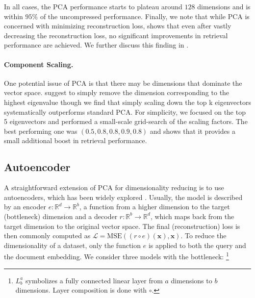 In all cases, the PCA performance starts to plateau around $128$ dimensions and is within $95\%$ of the uncompressed performance. 
Finally, we note that while PCA is concerned with minimizing reconstruction loss,   shows that even after vastly decreasing the reconstruction loss, no significant improvements in retrieval performance are achieved.
We further discuss this finding in .

\paragraph{Component Scaling.}
One potential issue of PCA is that there may be dimensions that dominate the vector space.
\citet{mu2017all} suggest to simply remove the dimension corresponding to the highest eigenvalue though we find that simply scaling down the top k eigenvectors systematically outperforms standard PCA.
For simplicity, we focused on the top 5 eigenvectors and performed a small-scale grid-search of the scaling factors.
The best performing one was $(0.5, 0.8, 0.8, 0.9, 0.8)$ and  shows that it provides a small additional boost in retrieval performance.

\subsection{Autoencoder} \label{subsec:auto}

A straightforward extension of PCA for dimensionality reducing is to use autoencoders, which has been widely explored \citep{hu2014improving,wang2016auto}.
Usually, the model is described by an encoder $e : \mathbb{R}^d \rightarrow \mathbb{R}^b$, a function from a higher dimension to the target (bottleneck) dimension and a decoder $r : \mathbb{R}^b \rightarrow \mathbb{R}^d$, which maps back from the target dimension to the original vector space.
The final (reconstruction) loss is then commonly computed as $\mathcal{L} = \text{MSE}((r \circ e)(\bm{x}), \bm{x})$.
To reduce the dimensionality of a dataset, only the function $e$ is applied to both the query and the document embedding.
We consider three models with the bottleneck:
\footnote{$L_b^a$ symbolizes a fully connected linear layer from $a$ dimensions to $b$ dimensions. Layer composition is done with $\circ$.}

